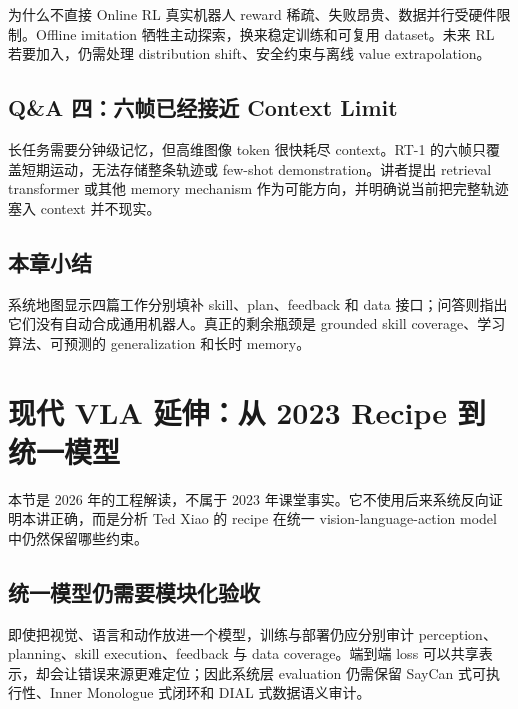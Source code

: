 \documentclass[a4paper]{article}
\begin{document}
\begin{knowledgebox}{为什么不直接 Online RL}
真实机器人 reward 稀疏、失败昂贵、数据并行受硬件限制。Offline imitation 牺牲主动探索，换来稳定训练和可复用 dataset。未来 RL 若要加入，仍需处理 distribution shift、安全约束与离线 value extrapolation。
\end{knowledgebox}

\subsection{Q\&A 四：六帧已经接近 Context Limit}

长任务需要分钟级记忆，但高维图像 token 很快耗尽 context。RT-1 的六帧只覆盖短期运动，无法存储整条轨迹或 few-shot demonstration。讲者提出 retrieval transformer 或其他 memory mechanism 作为可能方向，并明确说当前把完整轨迹塞入 context 并不现实。


\subsection{本章小结}

系统地图显示四篇工作分别填补 skill、plan、feedback 和 data 接口；问答则指出它们没有自动合成通用机器人。真正的剩余瓶颈是 grounded skill coverage、学习算法、可预测的 generalization 和长时 memory。

\section{现代 VLA 延伸：从 2023 Recipe 到统一模型}

本节是 2026 年的工程解读，不属于 2023 年课堂事实。它不使用后来系统反向证明本讲正确，而是分析 Ted Xiao 的 recipe 在统一 vision-language-action model 中仍然保留哪些约束。

\subsection{统一模型仍需要模块化验收}

即使把视觉、语言和动作放进一个模型，训练与部署仍应分别审计 perception、planning、skill execution、feedback 与 data coverage。端到端 loss 可以共享表示，却会让错误来源更难定位；因此系统层 evaluation 仍需保留 SayCan 式可执行性、Inner Monologue 式闭环和 DIAL 式数据语义审计。
\end{document}
